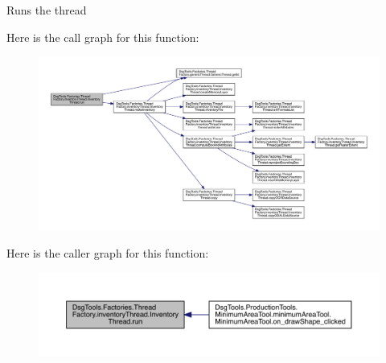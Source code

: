 \begin{DoxyVerb}Runs the thread
\end{DoxyVerb}
 Here is the call graph for this function\+:
\nopagebreak
\begin{figure}[H]
\begin{center}
\leavevmode
\includegraphics[width=350pt]{class_dsg_tools_1_1_factories_1_1_thread_factory_1_1inventory_thread_1_1_inventory_thread_aa1de63f12022456d0adfcad39c8e7c12_cgraph}
\end{center}
\end{figure}
Here is the caller graph for this function\+:
\nopagebreak
\begin{figure}[H]
\begin{center}
\leavevmode
\includegraphics[width=350pt]{class_dsg_tools_1_1_factories_1_1_thread_factory_1_1inventory_thread_1_1_inventory_thread_aa1de63f12022456d0adfcad39c8e7c12_icgraph}
\end{center}
\end{figure}
\mbox{\label{class_dsg_tools_1_1_factories_1_1_thread_factory_1_1inventory_thread_1_1_inventory_thread_af9397bb34d4df98d8074f960296fd412}} 
